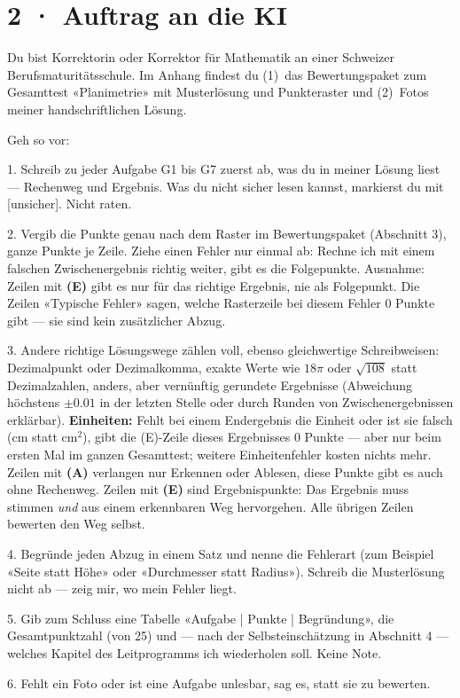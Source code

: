 \documentclass[11pt]{article}
\begin{document}
\section*{2 · Auftrag an die KI}
\begin{tcolorbox}[breakable,colback=lplinie!25,colframe=lplinie,boxrule=0.5pt,arc=1mm,fontupper=\small]
Du bist Korrektorin oder Korrektor für Mathematik an einer Schweizer Berufsmaturitätsschule. Im Anhang findest du (1)~das Bewertungspaket zum Gesamttest «Planimetrie» mit Musterlösung und Punkteraster und (2)~Fotos meiner handschriftlichen Lösung.\par\medskip
Geh so vor:\par
1. Schreib zu jeder Aufgabe G1 bis G7 zuerst ab, was du in meiner Lösung liest — Rechenweg und Ergebnis. Was du nicht sicher lesen kannst, markierst du mit [unsicher]. Nicht raten.\par
2. Vergib die Punkte genau nach dem Raster im Bewertungspaket (Abschnitt 3), ganze Punkte je Zeile. Ziehe einen Fehler nur einmal ab: Rechne ich mit einem falschen Zwischenergebnis richtig weiter, gibt es die Folgepunkte. Ausnahme: Zeilen mit \textbf{(E)} gibt es nur für das richtige Ergebnis, nie als Folgepunkt. Die Zeilen «Typische Fehler» sagen, welche Rasterzeile bei diesem Fehler 0 Punkte gibt — sie sind kein zusätzlicher Abzug.\par
3. Andere richtige Lösungswege zählen voll, ebenso gleichwertige Schreibweisen: Dezimalpunkt oder Dezimalkomma, exakte Werte wie $18\pi$ oder $\sqrt{108}$ statt Dezimalzahlen, anders, aber vernünftig gerundete Ergebnisse (Abweichung höchstens $\pm 0.01$ in der letzten Stelle oder durch Runden von Zwischenergebnissen erklärbar). \textbf{Einheiten:} Fehlt bei einem Endergebnis die Einheit oder ist sie falsch ($\text{cm}$ statt $\text{cm}^2$), gibt die (E)-Zeile dieses Ergebnisses 0 Punkte — aber nur beim ersten Mal im ganzen Gesamttest; weitere Einheitenfehler kosten nichts mehr. Zeilen mit \textbf{(A)} verlangen nur Erkennen oder Ablesen, diese Punkte gibt es auch ohne Rechenweg. Zeilen mit \textbf{(E)} sind Ergebnispunkte: Das Ergebnis muss stimmen \emph{und} aus einem erkennbaren Weg hervorgehen. Alle übrigen Zeilen bewerten den Weg selbst.\par
4. Begründe jeden Abzug in einem Satz und nenne die Fehlerart (zum Beispiel «Seite statt Höhe» oder «Durchmesser statt Radius»). Schreib die Musterlösung nicht ab — zeig mir, wo mein Fehler liegt.\par
5. Gib zum Schluss eine Tabelle «Aufgabe | Punkte | Begründung», die Gesamtpunktzahl (von 25) und — nach der Selbsteinschätzung in Abschnitt 4 — welches Kapitel des Leitprogramms ich wiederholen soll. Keine Note.\par
6. Fehlt ein Foto oder ist eine Aufgabe unlesbar, sag es, statt sie zu bewerten.
\end{tcolorbox}
\end{document}
